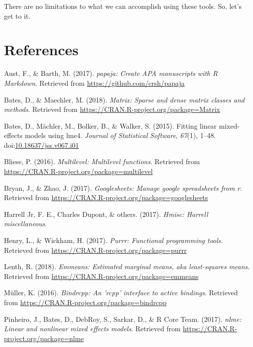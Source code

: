 \documentclass[english,man]{apa6}
\theoremstyle{definition}
\theoremstyle{definition}
\theoremstyle{definition}
\theoremstyle{remark}
\begin{document}
There are no limitations to what we can accomplish using these tools.
So, let's get to it.

\newpage

\section{References}\label{references}

\setlength{\parindent}{-0.5in} \setlength{\leftskip}{0.5in}

\hypertarget{refs}{}
\hypertarget{ref-R-papaja}{}
Aust, F., \& Barth, M. (2017). \emph{papaja: Create APA manuscripts with
R Markdown}. Retrieved from \url{https://github.com/crsh/papaja}

\hypertarget{ref-R-Matrix}{}
Bates, D., \& Maechler, M. (2018). \emph{Matrix: Sparse and dense matrix
classes and methods}. Retrieved from
\url{https://CRAN.R-project.org/package=Matrix}

\hypertarget{ref-R-lme4}{}
Bates, D., Mächler, M., Bolker, B., \& Walker, S. (2015). Fitting linear
mixed-effects models using lme4. \emph{Journal of Statistical Software},
\emph{67}(1), 1--48.
doi:\href{https://doi.org/10.18637/jss.v067.i01}{10.18637/jss.v067.i01}

\hypertarget{ref-R-multilevel}{}
Bliese, P. (2016). \emph{Multilevel: Multilevel functions}. Retrieved
from \url{https://CRAN.R-project.org/package=multilevel}

\hypertarget{ref-R-googlesheets}{}
Bryan, J., \& Zhao, J. (2017). \emph{Googlesheets: Manage google
spreadsheets from r}. Retrieved from
\url{https://CRAN.R-project.org/package=googlesheets}

\hypertarget{ref-R-Hmisc}{}
Harrell Jr, F. E., Charles Dupont, \& others. (2017). \emph{Hmisc:
Harrell miscellaneous}.

\hypertarget{ref-R-purrr}{}
Henry, L., \& Wickham, H. (2017). \emph{Purrr: Functional programming
tools}. Retrieved from \url{https://CRAN.R-project.org/package=purrr}

\hypertarget{ref-R-emmeans}{}
Lenth, R. (2018). \emph{Emmeans: Estimated marginal means, aka
least-squares means}. Retrieved from
\url{https://CRAN.R-project.org/package=emmeans}

\hypertarget{ref-R-bindrcpp}{}
Müller, K. (2016). \emph{Bindrcpp: An 'rcpp' interface to active
bindings}. Retrieved from
\url{https://CRAN.R-project.org/package=bindrcpp}

\hypertarget{ref-R-nlme}{}
Pinheiro, J., Bates, D., DebRoy, S., Sarkar, D., \& R Core Team. (2017).
\emph{nlme: Linear and nonlinear mixed effects models}. Retrieved from
\url{https://CRAN.R-project.org/package=nlme}
\end{document}
